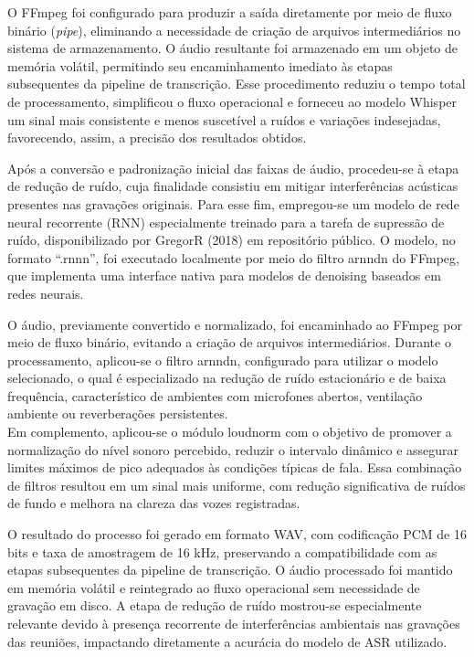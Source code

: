 O FFmpeg foi configurado para produzir a saída diretamente por meio de fluxo binário (\textit{pipe}), eliminando a necessidade de criação de arquivos intermediários no sistema de armazenamento. O áudio resultante foi armazenado em um objeto de memória volátil, permitindo seu encaminhamento imediato às etapas subsequentes da pipeline de transcrição. Esse procedimento reduziu o tempo total de processamento, simplificou o fluxo operacional e forneceu ao modelo Whisper um sinal mais consistente e menos suscetível a ruídos e variações indesejadas, favorecendo, assim, a precisão dos resultados obtidos.

Após a conversão e padronização inicial das faixas de áudio, procedeu-se à etapa de redução de ruído, cuja finalidade consistiu em mitigar interferências acústicas presentes nas gravações originais. Para esse fim, empregou-se um modelo de rede neural recorrente (RNN) especialmente treinado para a tarefa de supressão de ruído, disponibilizado por GregorR (2018) em repositório público. O modelo, no formato “.rnnn”, foi executado localmente por meio do filtro arnndn do FFmpeg, que implementa uma interface nativa para modelos de denoising baseados em redes neurais.

O áudio, previamente convertido e normalizado, foi encaminhado ao FFmpeg por meio de fluxo binário, evitando a criação de arquivos intermediários. Durante o processamento, aplicou-se o filtro arnndn, configurado para utilizar o modelo selecionado, o qual é especializado na redução de ruído estacionário e de baixa frequência, característico de ambientes com microfones abertos, ventilação ambiente ou reverberações persistentes. \\

Em complemento, aplicou-se o módulo loudnorm com o objetivo de promover a normalização do nível sonoro percebido, reduzir o intervalo dinâmico e assegurar limites máximos de pico adequados às condições típicas de fala. Essa combinação de filtros resultou em um sinal mais uniforme, com redução significativa de ruídos de fundo e melhora na clareza das vozes registradas.

O resultado do processo foi gerado em formato WAV, com codificação PCM de 16 bits e taxa de amostragem de 16 kHz, preservando a compatibilidade com as etapas subsequentes da pipeline de transcrição. O áudio processado foi mantido em memória volátil e reintegrado ao fluxo operacional sem necessidade de gravação em disco. A etapa de redução de ruído mostrou-se especialmente relevante devido à presença recorrente de interferências ambientais nas gravações das reuniões, impactando diretamente a acurácia do modelo de ASR utilizado.

